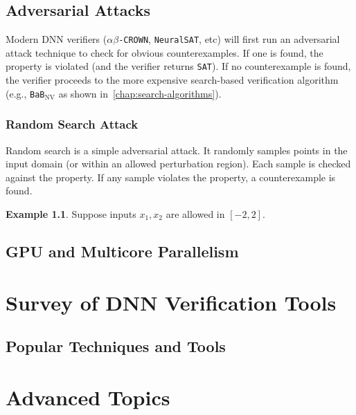 \documentclass[oneside,11pt,dvipsnames]{book}
\numberwithin{equation}{section}
\theoremstyle{definition}
\newtheorem{example}{Example}[section]
\theoremstyle{remark}
\newcommand{\sat}{\texttt{SAT}}
\newcommand{\crown}{\texttt{$\alpha\beta$-CROWN}}
\newcommand{\bab}{\texttt{BaB$_{\text{NV}}$}}
\newcommand{\neuralsat}{\texttt{NeuralSAT}}
\begin{document}
\chapter{Adversarial Attacks}

Modern DNN verifiers (\crown{}, \neuralsat{}, etc) will first run an adversarial attack technique to check for obvious counterexamples. If one is found, the property is violated (and the verifier returns \sat). If no counterexample is found, the verifier proceeds to the more expensive search-based verification algorithm (e.g., \bab{} as shown in~\autoref{chap:search-algorithms}).

\section{Random Search Attack}
Random search is a simple adversarial attack.  It randomly samples points in the input domain (or within an allowed perturbation region). Each sample is checked against the property.  If any sample violates the property, a counterexample is found.

\begin{example}
Suppose inputs $x_1, x_2$ are allowed in $[-2, 2]$.


\end{example}
\chapter{GPU and Multicore Parallelism}


\part{Survey of DNN Verification Tools}

\chapter{Popular Techniques and Tools}




\part{Advanced Topics\label{part:advanced-topics}}
\end{document}
